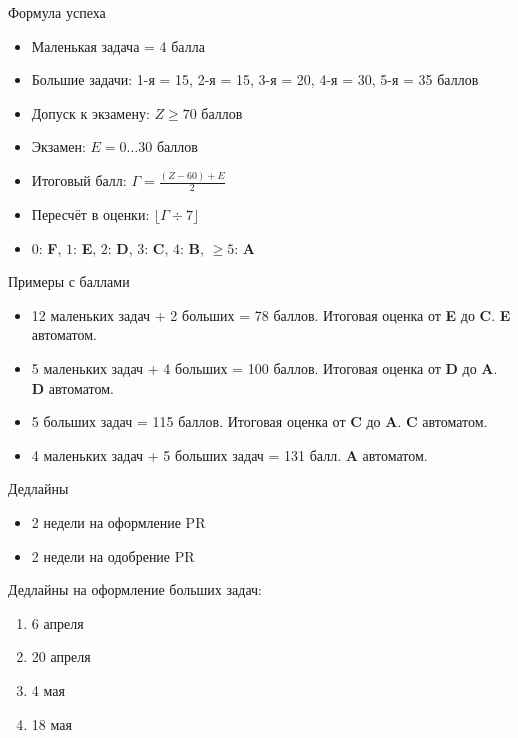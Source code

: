 \documentclass[unknownkeysallowed,xcolor=table]{beamer}
\begin{document}
\begin{frame}{Формула успеха}
  \begin{itemize}
    \item Маленькая задача = 4 балла \vspace{1em}
    \item Большие задачи: 1-я = 15, 2-я = 15, 3-я = 20, 4-я = 30, 5-я = 35 баллов \vspace{1em}
    \item Допуск к экзамену: $Z \geq 70$ баллов \vspace{1em}
    \item Экзамен: $E = 0 \dotso 30$ баллов \vspace{1em}
    \item Итоговый балл: $\Gamma = \frac{(Z-60) + E}{2}$ \vspace{1em}
    \item Пересчёт в оценки: $\lfloor\Gamma \div 7\rfloor$ \vspace{1em}
    \item $0$: \textbf{F}, $1$: \textbf{E}, $2$: \textbf{D}, $3$: \textbf{C}, $4$: \textbf{B}, $\geq 5$: \textbf{A}
  \end{itemize}
\end{frame}

\begin{frame}{Примеры с баллами}
  \begin{itemize}
    \item 12 маленьких задач + 2 больших = 78 баллов. Итоговая оценка от \textbf{E} до \textbf{C}. \textbf{E} автоматом. \vspace{1em}
    \item 5 маленьких задач + 4 больших = 100 баллов. Итоговая оценка от \textbf{D} до \textbf{A}. \textbf{D} автоматом. \vspace{1em}
    \item 5 больших задач = 115 баллов. Итоговая оценка от \textbf{C} до \textbf{A}. \textbf{C} автоматом. \vspace{1em}
    \item 4 маленьких задач + 5 больших задач = 131 балл. \textbf{A} автоматом.
  \end{itemize}
\end{frame}

\begin{frame}{Дедлайны}
  \begin{itemize}
    \item 2 недели на оформление PR
    \item 2 недели на одобрение PR
  \end{itemize}
  \vspace{3em}
  Дедлайны на оформление больших задач:
  \begin{enumerate}
    \item 6 апреля
    \item 20 апреля
    \item 4 мая
    \item 18 мая
  \end{enumerate}
\end{frame}
\end{document}
